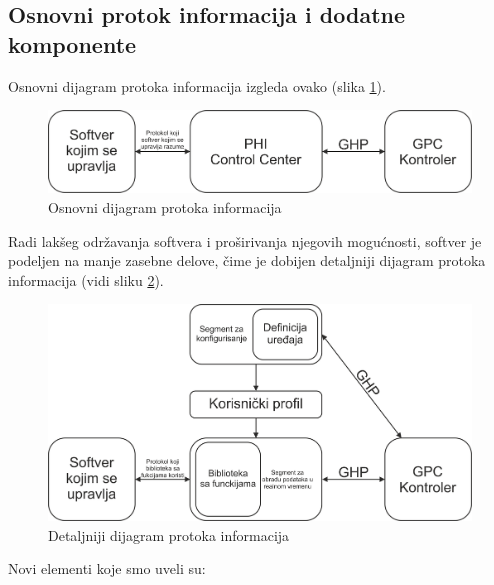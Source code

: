 \documentclass[12pt,oneside]{memoir}
\begin{document}
	\subsection{Osnovni protok informacija i dodatne komponente}
	Osnovni dijagram protoka informacija izgleda ovako (slika \ref{Slika:simple}).
	\begin{figure}[h]
		\includegraphics[width=\textwidth]{simple}
		\caption{Osnovni dijagram protoka informacija}
		\label{Slika:simple}
	\end{figure}
	 Radi lakšeg održavanja softvera i proširivanja njegovih mogućnosti, softver je podeljen na manje zasebne delove, čime je dobijen detaljniji dijagram protoka informacija (vidi sliku \ref{Slika:adv}).
	\begin{figure}[h]
		\includegraphics[width=\textwidth]{adv}
		\caption{Detaljniji dijagram protoka informacija}
		\label{Slika:adv}
	\end{figure}
	Novi elementi koje smo uveli su:
\end{document}
